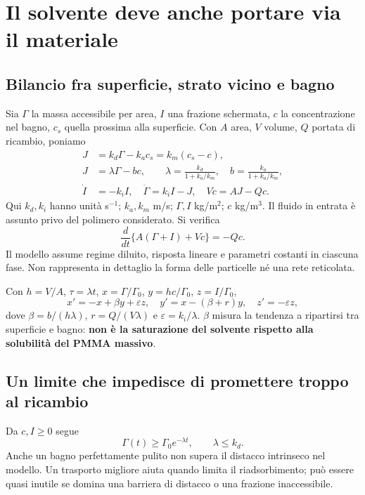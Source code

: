 \documentclass[11pt,reqno]{amsart}
\numberwithin{equation}{section}
\begin{document}
\section{Il solvente deve anche portare via il materiale}
\label{sec:transport}

\subsection{Bilancio fra superficie, strato vicino e bagno}
Sia $\Gamma$ la massa accessibile per area, $I$ una frazione
schermata, $c$ la concentrazione nel bagno, $c_s$ quella prossima
alla superficie. Con $A$ area, $V$ volume, $Q$ portata di ricambio,
poniamo
\begin{align}
 J&=k_d\Gamma-k_a c_s=k_m(c_s-c),\label{eq:flux}\\
 J&=\lambda\Gamma-bc,\qquad
 \lambda=\frac{k_d}{1+k_a/k_m},\quad
 b=\frac{k_a}{1+k_a/k_m},\label{eq:effective}\\
 \dot I&=-k_iI,\quad
 \dot\Gamma=k_iI-J,\quad
 V\dot c=AJ-Qc.\label{eq:balance}
\end{align}
Qui $k_d,k_i$ hanno unit\`a s$^{-1}$; $k_a,k_m$ m/s;
$\Gamma,I$ kg/m$^2$; $c$ kg/m$^3$. Il fluido in entrata \`e
assunto privo del polimero considerato. Si verifica
\begin{equation}
 \frac{d}{dt}\{A(\Gamma+I)+Vc\}=-Qc.
\end{equation}
Il modello assume regime diluito, risposta lineare e parametri
costanti in ciascuna fase. Non rappresenta in dettaglio la forma
delle particelle n\'e una rete reticolata.

Con $h=V/A$, $\tau=\lambda t$, $x=\Gamma/\Gamma_0$,
$y=hc/\Gamma_0$, $z=I/\Gamma_0$,
\begin{equation}\label{eq:dimensionless}
 x'=-x+\beta y+\varepsilon z,\quad
 y'=x-(\beta+r)y,\quad z'=-\varepsilon z,
\end{equation}
dove $\beta=b/(h\lambda)$, $r=Q/(V\lambda)$ e
$\varepsilon=k_i/\lambda$. $\beta$ misura la tendenza a
ripartirsi tra superficie e bagno: \textbf{non \`e la saturazione
del solvente rispetto alla solubilit\`a del PMMA massivo}.

\subsection{Un limite che impedisce di promettere troppo al ricambio}
Da $c,I\ge0$ segue
\begin{equation}\label{eq:bound}
 \Gamma(t)\ge\Gamma_0e^{-\lambda t},\qquad \lambda\le k_d.
\end{equation}
Anche un bagno perfettamente pulito non supera il distacco
intrinseco nel modello. Un trasporto migliore aiuta quando limita
il riadsorbimento; pu\`o essere quasi inutile se domina una
barriera di distacco o una frazione inaccessibile.
\end{document}
